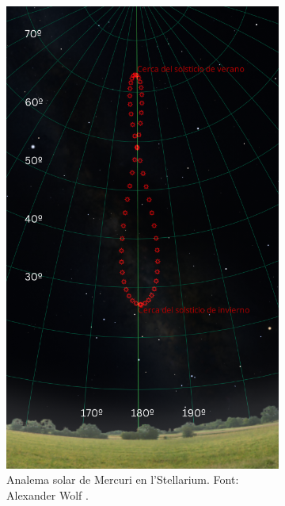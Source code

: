 \documentclass[a4paper, 11pt]{article}
\begin{document}
\begin{figure}[h!]
\begin{subfigure}{0.38\textwidth}
        \includegraphics[width=\textwidth]{images/analema_Terra_stellarium.png}
        \caption{Analema solar de Mercuri en l'Stellarium. Font: Alexander Wolf \cite{SCRIPT_STELLARIUM}.}
    \end{subfigure}
    \begin{subfigure}{0.52\textwidth}
        \centering

\end{subfigure}
\end{figure}
\end{document}
